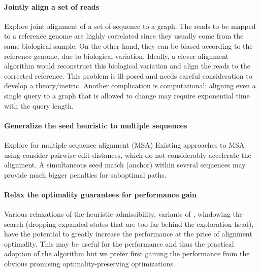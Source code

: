 \paragraph{Jointly align a set of reads}
Explore joint alignment of a set of sequence to a graph. The reads to be mapped
to a reference genome are highly correlated since they usually come from the
same biological sample. On the other hand, they can be biased according to the
reference genome, due to biological variation. Ideally, a clever alignment
algorithm would reconstruct this biological variation and align the reads to the
corrected reference. This problem is ill-posed and needs careful consideration
to develop a theory/metric. Another complication is computational: aligning even
a single query to a graph that is allowed to change may require exponential time
with the query length.

\paragraph{Generalize the seed heuristic to multiple sequences}
Explore \A for multiple sequence alignment (MSA) Existing approaches to MSA
using \A consider pairwise edit distances, which do not considerably accelerate
the alignment. A simultaneous seed match (anchor) within several sequences may
provide much bigger penalties for suboptimal paths.

\paragraph{Relax the \A optimality guarantees for performance gain}
Various relaxations of the heuristic admissibility, variants of \A, windowing
the search (dropping expanded states that are too far behind the exploration
head), have the potential to greatly increase the performance at the price of
alignment optimality. This may be useful for the performance and thus the
practical adoption of the algorithm but we prefer first gaining the performance
from the obvious promising optimality-preserving optimizations.

%

